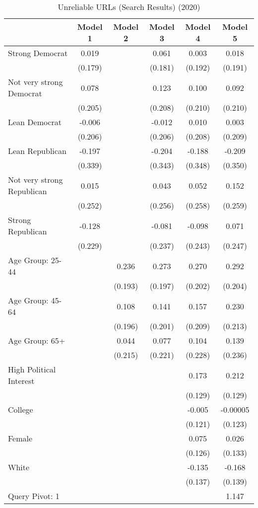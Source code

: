 \begin{table}

\caption{Unreliable URLs (Search Results) (2020)}
\centering
\begin{tabular}[t]{lccccc}
\toprule
  & Model 1 & Model 2 & Model 3 & Model 4 & Model 5\\
\midrule
Strong Democrat & 0.019 &  & 0.061 & 0.003 & 0.018\\
 & (0.179) &  & (0.181) & (0.192) & (0.191)\\
Not very strong Democrat & 0.078 &  & 0.123 & 0.100 & 0.092\\
 & (0.205) &  & (0.208) & (0.210) & (0.210)\\
Lean Democrat & -0.006 &  & -0.012 & 0.010 & 0.003\\
 & (0.206) &  & (0.206) & (0.208) & (0.209)\\
Lean Republican & -0.197 &  & -0.204 & -0.188 & -0.209\\
 & (0.339) &  & (0.343) & (0.348) & (0.350)\\
Not very strong Republican & 0.015 &  & 0.043 & 0.052 & 0.152\\
 & (0.252) &  & (0.256) & (0.258) & (0.259)\\
Strong Republican & -0.128 &  & -0.081 & -0.098 & 0.071\\
 & (0.229) &  & (0.237) & (0.243) & (0.247)\\
Age Group: 25-44 &  & 0.236 & 0.273 & 0.270 & 0.292\\
 &  & (0.193) & (0.197) & (0.202) & (0.204)\\
Age Group: 45-64 &  & 0.108 & 0.141 & 0.157 & 0.230\\
 &  & (0.196) & (0.201) & (0.209) & (0.213)\\
Age Group: 65+ &  & 0.044 & 0.077 & 0.104 & 0.139\\
 &  & (0.215) & (0.221) & (0.228) & (0.236)\\
High Political Interest &  &  &  & 0.173 & 0.212\\
 &  &  &  & (0.129) & (0.129)\\
College &  &  &  & -0.005 & -0.00005\\
 &  &  &  & (0.121) & (0.123)\\
Female &  &  &  & 0.075 & 0.026\\
 &  &  &  & (0.126) & (0.133)\\
White &  &  &  & -0.135 & -0.168\\
 &  &  &  & (0.137) & (0.139)\\
Query Pivot: 1 &  &  &  &  & 1.147\\

\end{tabular}
\end{table}
